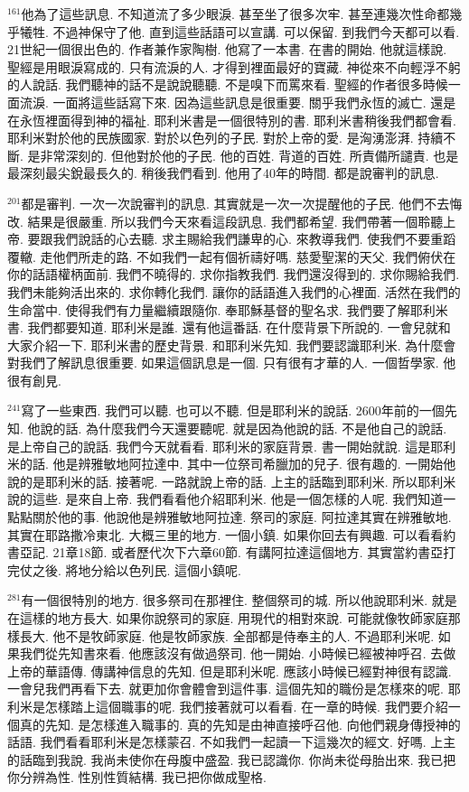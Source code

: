 \documentclass{book}
\begin{document}
$^{161}$他為了這些訊息.
不知道流了多少眼淚.
甚至坐了很多次牢.
甚至連幾次性命都幾乎犧牲.
不過神保守了他.
直到這些話語可以宣講.
可以保留.
到我們今天都可以看.
21世紀一個很出色的.
作者兼作家陶樹.
他寫了一本書.
在書的開始.
他就這樣說.
聖經是用眼淚寫成的.
只有流淚的人.
才得到裡面最好的寶藏.
神從來不向輕浮不躬的人說話.
我們聽神的話不是說說聽聽.
不是嗅下而罵來看.
聖經的作者很多時候一面流淚.
一面將這些話寫下來.
因為這些訊息是很重要.
關乎我們永恆的滅亡.
還是在永恆裡面得到神的福祉.
耶利米書是一個很特別的書.
耶利米書稍後我們都會看.
耶利米對於他的民族國家.
對於以色列的子民.
對於上帝的愛.
是洶湧澎湃.
持續不斷.
是非常深刻的.
但他對於他的子民.
他的百姓.
背道的百姓.
所責備所譴責.
也是最深刻最尖銳最長久的.
稍後我們看到.
他用了40年的時間.
都是說審判的訊息.

$^{201}$都是審判.
一次一次說審判的訊息.
其實就是一次一次提醒他的子民.
他們不去悔改.
結果是很嚴重.
所以我們今天來看這段訊息.
我們都希望.
我們帶著一個聆聽上帝.
要跟我們說話的心去聽.
求主賜給我們謙卑的心.
來教導我們.
使我們不要重蹈覆轍.
走他們所走的路.
不如我們一起有個祈禱好嗎.
慈愛聖潔的天父.
我們俯伏在你的話語權柄面前.
我們不曉得的.
求你指教我們.
我們還沒得到的.
求你賜給我們.
我們未能夠活出來的.
求你轉化我們.
讓你的話語進入我們的心裡面.
活然在我們的生命當中.
使得我們有力量繼續跟隨你.
奉耶穌基督的聖名求.
我們要了解耶利米書.
我們都要知道.
耶利米是誰.
還有他這番話.
在什麼背景下所說的.
一會兒就和大家介紹一下.
耶利米書的歷史背景.
和耶利米先知.
我們要認識耶利米.
為什麼會對我們了解訊息很重要.
如果這個訊息是一個.
只有很有才華的人.
一個哲學家.
他很有創見.

$^{241}$寫了一些東西.
我們可以聽.
也可以不聽.
但是耶利米的說話.
2600年前的一個先知.
他說的話.
為什麼我們今天還要聽呢.
就是因為他說的話.
不是他自己的說話.
是上帝自己的說話.
我們今天就看看.
耶利米的家庭背景.
書一開始就說.
這是耶利米的話.
他是辨雅敏地阿拉達中.
其中一位祭司希臘加的兒子.
很有趣的.
一開始他說的是耶利米的話.
接著呢.
一路就說上帝的話.
上主的話臨到耶利米.
所以耶利米說的這些.
是來自上帝.
我們看看他介紹耶利米.
他是一個怎樣的人呢.
我們知道一點點關於他的事.
他說他是辨雅敏地阿拉達.
祭司的家庭.
阿拉達其實在辨雅敏地.
其實在耶路撒冷東北.
大概三里的地方.
一個小鎮.
如果你回去有興趣.
可以看看約書亞記.
21章18節.
或者歷代次下六章60節.
有講阿拉達這個地方.
其實當約書亞打完仗之後.
將地分給以色列民.
這個小鎮呢.

$^{281}$有一個很特別的地方.
很多祭司在那裡住.
整個祭司的城.
所以他說耶利米.
就是在這樣的地方長大.
如果你說祭司的家庭.
用現代的相對來說.
可能就像牧師家庭那樣長大.
他不是牧師家庭.
他是牧師家族.
全部都是侍奉主的人.
不過耶利米呢.
如果我們從先知書來看.
他應該沒有做過祭司.
他一開始.
小時候已經被神呼召.
去做上帝的華語傳.
傳講神信息的先知.
但是耶利米呢.
應該小時候已經對神很有認識.
一會兒我們再看下去.
就更加你會體會到這件事.
這個先知的職份是怎樣來的呢.
耶利米是怎樣踏上這個職事的呢.
我們接著就可以看看.
在一章的時候.
我們要介紹一個真的先知.
是怎樣進入職事的.
真的先知是由神直接呼召他.
向他們親身傳授神的話語.
我們看看耶利米是怎樣蒙召.
不如我們一起讀一下這幾次的經文.
好嗎.
上主的話臨到我說.
我尚未使你在母腹中盛盈.
我已認識你.
你尚未從母胎出來.
我已把你分辨為性.
性別性質結構.
我已把你做成聖格.
\end{document}
